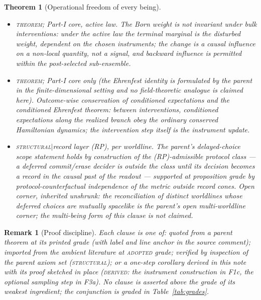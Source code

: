 \documentclass[11pt]{article}
\newtheorem{theorem}{Theorem}
\newtheorem{remark}{Remark}
\newcommand{\THM}{{\normalfont\scshape theorem}}                %
\newcommand{\ADOPTED}{{\normalfont\scshape adopted}}            %
\newcommand{\STRUCT}{{\normalfont\scshape structural}}          %
\newcommand{\DERIVED}{{\normalfont\scshape derived}}            %
\begin{document}
\begin{theorem}[Operational freedom of every being]
\begin{itemize}
limit,
and for accessible sub-filtrations the residual entropy $H(K\mid\mathcal G)\ge0$
can remain strictly positive: definiteness never precedes the records.
\item[\textbf{(F4a)}] \THM{}; Part-I core, active law. The Born weight is not
invariant under bulk interventions: under the active law the terminal marginal
is the disturbed weight, dependent on the chosen instruments; the change is a
causal influence on a non-local quantity, not a signal, and backward influence
is permitted within the post-selected sub-ensemble.
\item[\textbf{(F4b)}] \THM{}; Part-I core only (the Ehrenfest identity is
formulated by the parent in the finite-dimensional setting and no
field-theoretic analogue is claimed here). Outcome-wise conservation of
conditioned expectations and the conditioned Ehrenfest theorem: \emph{between}
interventions, conditioned expectations along the realized branch obey the
ordinary conserved Hamiltonian dynamics; the intervention step itself is the
instrument update.
\item[\textbf{(F4c)}] \STRUCT{}$\mid$record layer (RP), per worldline. The
parent's delayed-choice scope statement holds by construction of the
(RP)-admissible protocol class --- a deferred commit/erase decider is outside
the class until its decision becomes a record in the causal past of the readout
--- supported at proposition grade by protocol-counterfactual independence of
the metric outside record cones.
\emph{Open corner, inherited unshrunk:} the reconciliation of \emph{distinct}
worldlines whose deferred choices are mutually spacelike is the parent's open
multi-worldline corner; the multi-being form of this clause is not claimed.
\end{itemize}
\end{theorem}

\begin{remark}[Proof discipline]\label{rem:discipline}
Each clause is one of: quoted from a parent theorem at its printed grade (with
label and line anchor in the source comment); imported from the ambient
literature at \ADOPTED{} grade; verified by inspection of the parent axiom set
(\STRUCT{}); or a one-step corollary derived in this note with its proof
sketched in place (\DERIVED{}: the instrument construction in F1c, the optional
sampling step in F3a). No clause is asserted above the grade of its weakest
ingredient; the conjunction is graded in Table~\ref{tab:grades}.
\end{remark}
\end{document}
